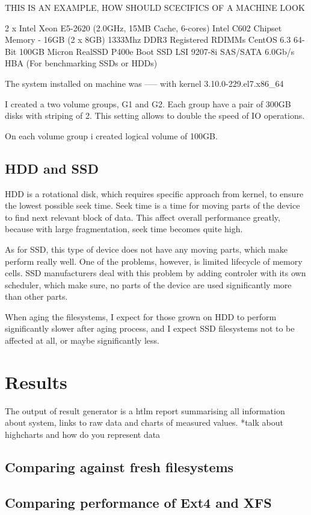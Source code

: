 \documentclass[
  color, %
  table, %
  lof,   %
  lot,   %
]{fithesis3}
\begin{document}
THIS IS AN EXAMPLE, HOW SHOULD SCECIFICS OF A MACHINE LOOK

2 x Intel Xeon E5-2620 (2.0GHz, 15MB Cache, 6-cores)
Intel C602 Chipset
Memory - 16GB (2 x 8GB) 1333Mhz DDR3 Registered RDIMMs
 CentOS 6.3 64-Bit
100GB Micron RealSSD P400e Boot SSD
LSI 9207-8i SAS/SATA 6.0Gb/s HBA (For benchmarking SSDs or HDDs)

The system installed on machine was ----- with kernel 3.10.0-229.el7.x86\_64 

I created a two volume groups, G1 and G2. Each group have a pair of 300GB disks with striping of 2. This setting allows to double the speed of IO operations.

On each volume group i created logical volume of 100GB.
\section{HDD and SSD}
HDD is a rotational disk, which requires specific approach from kernel, to ensure the lowest possible seek time. Seek time is a time for moving parts of the device to find next relevant block of data. This affect overall performance greatly, because with large fragmentation, seek time becomes quite high.

As for SSD, this type of device does not have any moving parts, which make perform really well. One of the problems, however, is limited lifecycle of memory cells. SSD manufacturers deal with this problem by adding controler with its own scheduler, which make sure, no parts of the device are used significantly more than other parts.

When aging the filesystems, I expect for those grown on HDD to perform significantly slower after aging process, and I expect SSD filesystems not to be affected at all, or maybe significantly less.

\chapter{Results}
The output of result generator is a htlm report summarising all information about system, links to raw data and charts of measured values.
*talk about highcharts and how do you represent data

\section{Comparing against fresh filesystems}
\section{Comparing performance of Ext4 and XFS}
\end{document}

